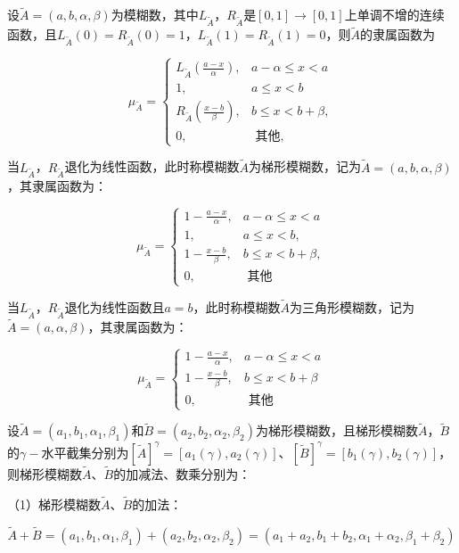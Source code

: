 \documentclass[]{article}
\begin{document}
设\(\tilde{A}=(a, b, \alpha, \beta)\)为模糊数，其中\(L_{\widetilde{A}}\)，\(R_{\widetilde{A}}\)是\([0,1]\to[0,1]\)上单调不增的连续函数，且\(L_{\widetilde{A}}(0)=R_{\widetilde{A}}(0)=1\)，\(L_{\widetilde{A}}(1)=R_{\widetilde{A}}(1)=0\)，则\(\widetilde{A}\)的隶属函数为

\[\mu_{\tilde{A}}=\left\{\begin{array}{ll}
L_{\tilde{A}}\left(\frac{a-x}{\alpha}\right), & a-\alpha \leq x<a \\
1, & a \leq x<b \\
R_{\tilde{A}}\left(\frac{x-b}{\beta}\right), & b \leq x<b+\beta, \\
0, & \text { 其他, }
\end{array}\right.\]

当\(L_{\widetilde{A}}\)，\(R_{\widetilde{A}}\)退化为线性函数，此时称模糊数\(\widetilde{A}\)为梯形模糊数，记为\(\tilde{A}=(a, b, \alpha, \beta)\)，其隶属函数为：

\[\mu_{\tilde{A}}=\left\{\begin{array}{ll}
1-\frac{a-x}{\alpha}, & a-\alpha \leq x<a \\
1, & a \leq x<b, \\
1-\frac{x-b}{\beta}, & b \leq x<b+\beta, \\
0, & \text { 其他 }
\end{array}\right.\]

当\(L_{\widetilde{A}}\)，\(R_{\widetilde{A}}\)退化为线性函数且\(a=b\)，此时称模糊数\(\widetilde{A}\)为三角形模糊数，记为\(\tilde{A}=(a, \alpha, \beta)\)，其隶属函数为：

\[\mu_{\tilde{A}}=\left\{\begin{array}{ll}
1-\frac{a-x}{\alpha}, & a-\alpha \leq x<a \\
1-\frac{x-b}{\beta}, & b \leq x<b+\beta \\
0, & \text { 其他 }
\end{array}\right.\]

设\(\tilde{A}=(a_{1}, b_{1}, \alpha_{1}, \beta_{1})\)和\(\tilde{B}=(a_{2}, b_{2}, \alpha_{2}, \beta_{2})\)为梯形模糊数，且梯形模糊数\(\widetilde{A}\)，\(\widetilde{B}\)的\(\gamma-\)水平截集分别为\([\tilde{A}]^{\gamma}=\left[a_{1}(\gamma), a_{2}(\gamma)\right]\)、\([\tilde{B}]^{\gamma}=\left[b_{1}(\gamma), b_{2}(\gamma)\right]\)，则梯形模糊数\(\widetilde{A}\)、\(\widetilde{B}\)的加减法、数乘分别为：

（1）梯形模糊数\(\widetilde{A}\)、\(\widetilde{B}\)的加法：

\[\tilde{A}+\tilde{B}=\left(a_{1}, b_{1}, \alpha_{1}, \beta_{1}\right)+\left(a_{2}, b_{2}, \alpha_{2}, \beta_{2}\right)=\left(a_{1}+a_{2}, b_{1}+b_{2}, \alpha_{1}+\alpha_{2}, \beta_{1}+\beta_{2}\right)\]
\end{document}
